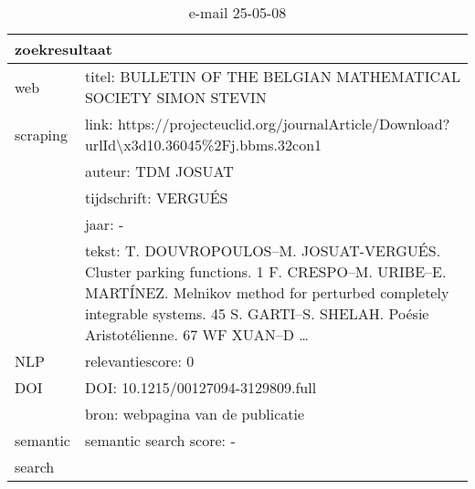 \begin{table}[h!]
    \caption{e-mail 25-05-08}
    \centering
    \begin{tabularx}{\textwidth}{|p{4cm}|X|} 
        \hline
        \multicolumn{2}{|X|}{\textbf{zoekresultaat}} \\
        \hline
        web &titel: BULLETIN OF THE BELGIAN MATHEMATICAL SOCIETY SIMON STEVIN\\
        scraping&link: https://projecteuclid.org/journalArticle/Download?urlId\textbackslash x3d10.36045\%2Fj.bbms.32con1\\
        &auteur: TDM JOSUAT\\
        &tijdschrift: VERGUÉS\\
        &jaar: -\\
        &tekst: T. DOUVROPOULOS–M. JOSUAT-VERGUÉS. Cluster parking functions. 1 F. CRESPO–M. URIBE–E. MARTÍNEZ. Melnikov method for perturbed completely integrable systems. 45 S. GARTI–S. SHELAH. Poésie Aristotélienne. 67 WF XUAN–D …\\
        \hline
        NLP&relevantiescore: 0\\
        \hline
        DOI&DOI: 10.1215/00127094-3129809.full\\
        &bron: webpagina van de publicatie\\
        \hline
        semantic&semantic search score: -\\
        search&\\
        \hline
    \end{tabularx}
    \label{table:email20250508}
\end{table}

